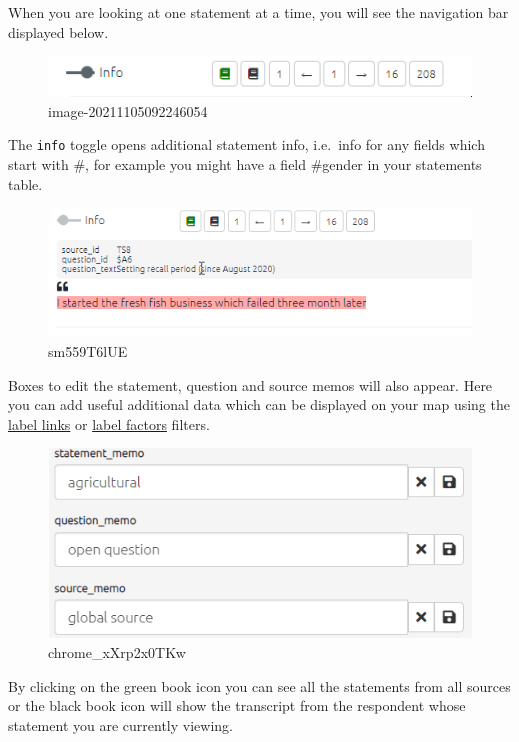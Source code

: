\documentclass[
]{book}
\begin{document}
When you are looking at one statement at a time, you will see the navigation bar displayed below.

\begin{figure}
\centering
\includegraphics{_assets/image-20211105092246054.png}
\caption{image-20211105092246054}
\end{figure}

The \texttt{info} toggle opens additional statement info, i.e.~info for any fields which start with \#, for example you might have a field \#gender in your statements table.

\begin{figure}
\centering
\includegraphics{_assets/sm559T6lUE.gif}
\caption{sm559T6lUE}
\end{figure}

Boxes to edit the statement, question and source memos will also appear. Here you can add useful additional data which can be displayed on your map using the \href{xformatting-links}{label links} or \protect\hyperlink{xlabel-factors}{label factors} filters.

\begin{figure}
\centering
\includegraphics[width=6.77083in,height=\textheight]{_assets/chrome_xXrp2x0TKw.png}
\caption{chrome\_xXrp2x0TKw}
\end{figure}

By clicking on the green book icon you can see all the statements from all sources or the black book icon will show the transcript from the respondent whose statement you are currently viewing.
\end{document}

